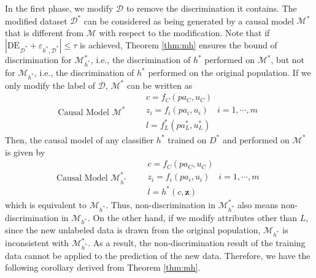 \documentclass{article}
\begin{document}
In the first phase, we modify $\mathcal{D}$ to remove the discrimination it contains. The modified dataset $\mathcal{D}^{*}$ can be considered as being generated by a causal model $\mathcal{M}^{*}$ that is different from $\mathcal{M}$ with respect to the modification. Note that if $\left|\mathrm{DE}_{\mathcal{D}^{*}} \!+\! \varepsilon_{h^{*},\mathcal{D}^{*}}\right| \leq \tau$ is achieved, Theorem \ref{thm:mh} ensures the bound of discrimination for $\mathcal{M}^{*}_{h^{*}}$, i.e., the discrimination of $h^{*}$ performed on $\mathcal{M}^{*}$, but not for $\mathcal{M}_{h^{*}}$, i.e., the discrimination of $h^{*}$ performed on the original population. If we only modify the label of $\mathcal{D}$, $\mathcal{M}^{*}$ can be written as
\begin{equation*}
\textrm{Causal Model $\mathcal{M}^{*}$} \quad\quad
\begin{array}{l}
c = f_{C}(pa_{C},u_{C}) \\
z_{i} = f_{i}(pa_{i},u_{i}) \quad i=1,\cdots,m \\
l = f_{L}^{*}(pa_{L}^{*},u_{L}^{*})
\end{array}
\end{equation*}
Then, the causal model of any classifier $h^{*}$ trained on $D^{*}$ and performed on $\mathcal{M}^{*}$ is given by
\begin{equation*}
\textrm{Causal Model $\mathcal{M}^{*}_{h^{*}}$} \quad\quad
\begin{array}{l}
c = f_{C}(pa_{C},u_{C}) \\
z_{i} = f_{i}(pa_{i},u_{i}) \quad i=1,\cdots,m \\
l = h^{*}(c,\mathbf{z})
\end{array}
\end{equation*}
which is equivalent to $\mathcal{M}_{h^{*}}$. Thus, non-discrimination in $\mathcal{M}^{*}_{h^{*}}$ also means non-discrimination in $\mathcal{M}_{h^{*}}$. On the other hand,  if we modify attributes other than $L$, since the new unlabeled data is drawn from the original population, $\mathcal{M}_{h^{*}}$ is inconsistent with $\mathcal{M}^{*}_{h^{*}}$. As a result, the non-discrimination result of the training data cannot be applied to the prediction of the new data. Therefore, we have the following corollary derived from Theorem \ref{thm:mh}.

\end{document}
